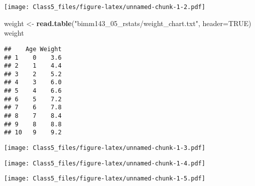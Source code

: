 \documentclass[]{article}
\newenvironment{Shaded}{\begin{snugshade}}{\end{snugshade}}
\newcommand{\DataTypeTok}[1]{\textcolor[rgb]{0.13,0.29,0.53}{#1}}
\newcommand{\DecValTok}[1]{\textcolor[rgb]{0.00,0.00,0.81}{#1}}
\newcommand{\FloatTok}[1]{\textcolor[rgb]{0.00,0.00,0.81}{#1}}
\newcommand{\KeywordTok}[1]{\textcolor[rgb]{0.13,0.29,0.53}{\textbf{#1}}}
\newcommand{\NormalTok}[1]{#1}
\newcommand{\OperatorTok}[1]{\textcolor[rgb]{0.81,0.36,0.00}{\textbf{#1}}}
\newcommand{\OtherTok}[1]{\textcolor[rgb]{0.56,0.35,0.01}{#1}}
\newcommand{\StringTok}[1]{\textcolor[rgb]{0.31,0.60,0.02}{#1}}
\begin{document}
\texttt{[image: Class5\_files/figure-latex/unnamed-chunk-1-2.pdf]}

\begin{Shaded}
\begin{Highlighting}[]
\NormalTok{weight <-}\StringTok{ }\KeywordTok{read.table}\NormalTok{(}\StringTok{"bimm143_05_rstats/weight_chart.txt"}\NormalTok{, }\DataTypeTok{header=}\OtherTok{TRUE}\NormalTok{)}
\NormalTok{weight}
\end{Highlighting}
\end{Shaded}

\begin{verbatim}
##    Age Weight
## 1    0    3.6
## 2    1    4.4
## 3    2    5.2
## 4    3    6.0
## 5    4    6.6
## 6    5    7.2
## 7    6    7.8
## 8    7    8.4
## 9    8    8.8
## 10   9    9.2
\end{verbatim}

\begin{Shaded}
\end{Shaded}

\texttt{[image: Class5\_files/figure-latex/unnamed-chunk-1-3.pdf]}

\begin{Shaded}
\end{Shaded}

\texttt{[image: Class5\_files/figure-latex/unnamed-chunk-1-4.pdf]}

\begin{Shaded}
\end{Shaded}

\texttt{[image: Class5\_files/figure-latex/unnamed-chunk-1-5.pdf]}

\begin{Shaded}
\end{Shaded}
\end{document}
